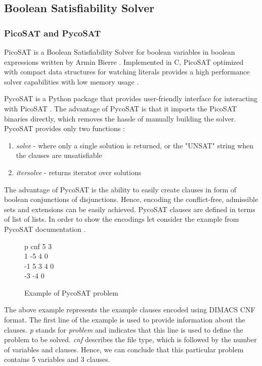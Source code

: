\subsection{Boolean Satisfiability Solver} \label{section:satSolver}


\subsubsection{PicoSAT and PycoSAT} \label{section:pycosat}
PicoSAT is a Boolean Satisfiability Solver for boolean variables in boolean expressions written by Armin Bierre \citep{picosatMan}. Implemented in C, PicoSAT optimized with compact data structures for watching literals provides a high performance solver capabilities with low memory usage \citep{picosat}.

PycoSAT is a Python package that provides user-friendly interface for interacting with PicoSAT \citep{pycoSat}. The advantage of PycoSAT is that it imports the PicoSAT binaries directly, which removes the hassle of manually building the solver. PycoSAT provides only two functions \citep{pycosatPyPi}: 
\begin{enumerate}
	\item \textit{solve} - where only a single solution is returned, or the "UNSAT" string when the clauses are unsatisfiable
	\item \textit{itersolve} - returns iterator over solutions
\end{enumerate}

The advantage of PycoSAT is the ability to easily create clauses in form of boolean conjunctions of disjunctions. Hence, encoding the conflict-free, admissible sets and extensions can be easily achieved. PycoSAT clauses are defined in terms of list of lists. In order to show the encodings let consider the example from PycoSAT documentation \citep{pycosatGithub}. 

\begin{figure}
\begin{tcolorbox}
	p cnf 5 3 \\
	1 -5 4 0 \\ 
	-1 5 3 4 0 \\
	-3 -4 0 
\end{tcolorbox}
\caption{Example of PycoSAT problem}
\label{fig:pycosat1}
\end{figure}

The above example represents the example clauses encoded using DIMACS CNF format. The first line of the example is used to provide information about the clauses. \textit{p} stands for \textit{problem} and indicates that this line is used to define the problem to be solved. \textit{cnf} describes the file type, which is followed by the number of variables and clauses. Hence, we can conclude that this particular problem contains 5 variables and 3 clauses. 

